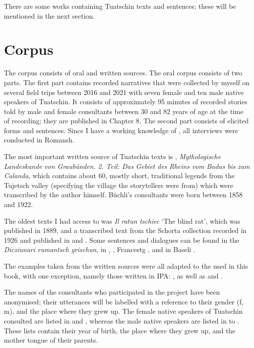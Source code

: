 There are some works containing Tuatschin texts and sentences; these will be mentioned in the next section.

\section{Corpus}\label{sec:1.2}
The corpus consists of oral and written sources. The oral corpus consists of two parts. The first part contains recorded narratives that were collected by myself on several field trips between 2016 and 2021 with seven female and ten male native speakers of Tuatschin. It consists of approximately 95 minutes of recorded stories told by male and female consultants between 30 and 82 years of age at the time of recording; they are published in Chapter 8. The second part consists of elicited forms and sentences. Since I have a working knowledge of , all interviews were conducted in Romansh.

The most important written source of Tuatschin texts is \citet{Büchli1966}, \textit{Mythologische Landeskunde von Graubünden. 2. Teil: Das Gebiet des Rheins vom Badus bis zum Calanda}, which contains about 60, mostly short, traditional legends from the Tujetsch valley (specifying the village the storytellers were from) which were transcribed by the author himself. Büchli's consultants were born between 1858 and 1922.

The oldest texts I had access to was \textit{Il ratun tschiec} `The blind rat', which was published in 1889, and a transcribed text from the Schorta collection recorded in 1926 and published in \citet{Valär2013a} and \citet{Valär2013b}. Some sentences and dialogues can be found in the \textit{Dicziunari rumantsch grischun}, in \citet{Gartner1910}, \citet{Gadola1935}, Francestg \citet{Berther1998}, and in Baseli \citet{Berther2007}. 

\largerpage
The examples taken from the written sources were all adapted to the  used in this book, with one exception, namely those written in IPA: \citet{Gartner1910}, as well as \citet{Valär2013a} and \citet{Valär2013b}.
  
\newpage
The names of the consultants who participated in the project have been anon\-y\-mised; their utterances will be labelled with a reference to their gender (f, m), and the place where they grew up. The female native speakers of Tuatschin consulted are listed in  and , whereas the male native speakers are listed in  to . These lists contain their year of birth, the place where they grew up, and the mother tongue of their parents.

